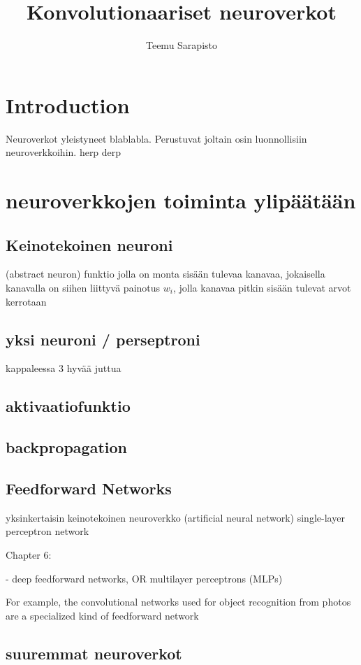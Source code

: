 \documentclass[11pt]{article}
\theoremstyle{plain}
\theoremstyle{definition}
\begin{document}
  \title{Konvolutionaariset neuroverkot}
  \author{Teemu Sarapisto}
  \maketitle

  \section{Introduction}


  Neuroverkot yleistyneet blablabla. Perustuvat joltain osin luonnollisiin neuroverkkoihin. herp \cite{Goodfellow-et-al-2016} derp


  \section{neuroverkkojen toiminta ylipäätään}
  \subsection{Keinotekoinen neuroni}
  (abstract neuron)
  funktio jolla on monta sisään tulevaa kanavaa, jokaisella kanavalla on siihen liittyvä painotus $w_i$, jolla kanavaa pitkin sisään tulevat arvot kerrotaan
  \subsection{yksi neuroni / perseptroni}
   kappaleessa 3 hyvää juttua \cite{Rojas96}
  \subsection{aktivaatiofunktio}
  \subsection{backpropagation}
  \subsection{Feedforward Networks}
  yksinkertaisin keinotekoinen neuroverkko (artificial neural network)
  single-layer perceptron network

   Chapter 6:

   - deep feedforward networks, OR multilayer perceptrons (MLPs) \cite{Rojas96}

  For example, the convolutional networks used for object recognition from photos are a specialized kind of feedforward network

  \subsection{suuremmat neuroverkot}
\end{document}
